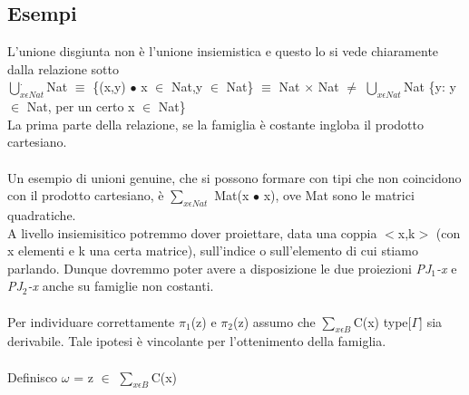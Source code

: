 \subsection{Esempi}
\label{subsec:esempi}
L'unione disgiunta non \`e l'unione insiemistica e questo lo si vede chiaramente dalla relazione sotto\\
\noindent
$\bigcup\limits_{x \epsilon Nat}^.$Nat $\equiv$ \{(x,y) $\bullet$ x $\in$ Nat,y $\in$ Nat\} $\equiv$ Nat $\times$ Nat $\neq$ $\bigcup\limits_{x \epsilon Nat}$Nat \{y: y $\in$ Nat, per un certo x $\in$ Nat\}\\
\noindent
La prima parte della relazione, se la famiglia \`e costante ingloba il prodotto cartesiano.\\\\
\noindent
Un esempio di unioni genuine, che si possono formare con tipi che non coincidono con il prodotto cartesiano, \`e $\sum\limits_{x \epsilon Nat}$ Mat(x $\bullet$ x), ove Mat sono le matrici quadratiche.\\
A livello insiemisitico potremmo dover proiettare, data una coppia $<$x,k$>$ (con x elementi e k una certa matrice), sull'indice o sull'elemento di cui stiamo parlando. Dunque dovremmo poter avere a disposizione le due proiezioni \textit{PJ$_1$-x} e \textit{PJ$_2$-x} anche su famiglie non costanti.\\\\
\noindent
Per individuare correttamente $\pi_1$(z) e $\pi_2$(z) assumo che $\sum\limits_{x \epsilon B}$C(x) type[$\Gamma$] sia derivabile. Tale ipotesi \`e vincolante per l'ottenimento della famiglia. \\\\
\noindent
Definisco $\omega$ = z $\in$ $\sum\limits_{x \epsilon B}$C(x)
